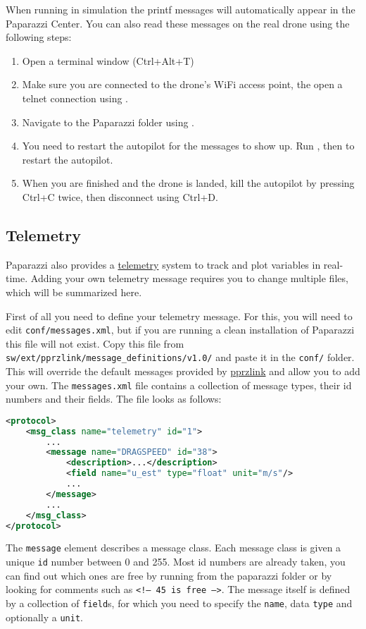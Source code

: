 \documentclass{article}
\begin{document}
When running in simulation the printf messages will automatically appear in the Paparazzi Center. You can also read these messages on the real drone using the following steps:
\begin{enumerate}
\item Open a terminal window (Ctrl+Alt+T)
\item Make sure you are connected to the drone's WiFi access point, the open a telnet connection using .
\item Navigate to the Paparazzi folder using .
\item You need to restart the autopilot for the messages to show up. Run , then  to restart the autopilot.
\item When you are finished and the drone is landed, kill the autopilot by pressing Ctrl+C twice, then disconnect using Ctrl+D.
\end{enumerate}


\subsection{Telemetry}
Paparazzi also provides a \href{https://wiki.paparazziuav.org/wiki/Telemetry}{telemetry} system to track and plot variables in real-time.
Adding your own telemetry message requires you to change multiple files, which will be summarized here.

First of all you need to define your telemetry message. For this, you will need to edit \texttt{conf/messages.xml}, but if you are running a clean installation of Paparazzi this file will not exist. Copy this file from \texttt{sw/ext/pprzlink/message\_definitions/v1.0/} and paste it in the \texttt{conf/} folder. This will override the default messages provided by \href{https://github.com/paparazzi/pprzlink}{pprzlink} and allow you to add your own.
The \texttt{messages.xml} file contains a collection of message types, their id numbers and their fields. The file looks as follows:
\begin{lstlisting}[language=xml]
<protocol>
	<msg_class name="telemetry" id="1">
		...
		<message name="DRAGSPEED" id="38">
			<description>...</description>
			<field name="u_est" type="float" unit="m/s"/>
			...
		</message>
		...
	</msg_class>
</protocol>
\end{lstlisting}
The \texttt{message} element describes a message class. Each message class is given a unique \texttt{id} number between 0 and 255. Most id numbers are already taken, you can find out which ones are free by running  from the paparazzi folder or by looking for comments such as \texttt{<!-- 45 is free -->}.
The message itself is defined by a collection of \texttt{field}s, for which you need to specify the \texttt{name}, data \texttt{type} and optionally a \texttt{unit}.
\end{document}
